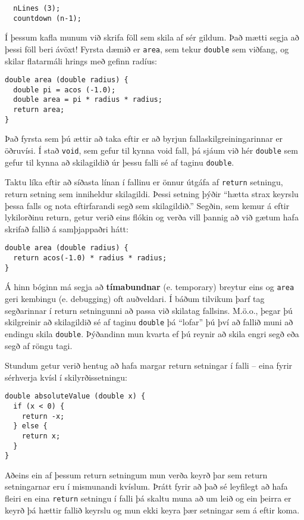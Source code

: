 \begin{verbatim}
  nLines (3);
  countdown (n-1);
\end{verbatim}
%
Í þessum kafla munum við skrifa föll sem skila af sér gildum.
Það mætti segja að þessi föll beri ávöxt!
Fyrsta dæmið er {\tt area}, sem tekur {\tt double} sem viðfang, og skilar flatarmáli hrings með gefinn radíus:


\begin{verbatim}
double area (double radius) {
  double pi = acos (-1.0);
  double area = pi * radius * radius;
  return area;
}
\end{verbatim}
%
Það fyrsta sem þú ættir að taka eftir er að byrjun fallaskilgreiningarinnar er öðruvísi.
Í stað {\tt void}, sem gefur til kynna void fall, þá sjáum við hér {\tt double} sem gefur til kynna að skilagildið úr þessu falli sé af taginu {\tt double}.

Taktu líka eftir að síðasta línan í fallinu er önnur útgáfa af {\tt return} setningu, return setning sem inniheldur skilagildi.
Þessi setning þýðir ``hætta strax keyrslu þessa falls og nota eftirfarandi segð sem skilagildið.''
Segðin, sem kemur á eftir lykilorðinu return, getur verið eins flókin og verða vill þannig að við gætum hafa skrifað fallið á samþjappaðri hátt:

\begin{verbatim}
double area (double radius) {
  return acos(-1.0) * radius * radius;
}
\end{verbatim}
%
Á hinn bóginn má segja að {\bf tímabundnar} (e. temporary) breytur eins og {\tt area} geri kembingu (e. debugging) oft auðveldari.
Í báðum tilvikum þarf tag segðarinnar í return setningunni að passa við skilatag fallsins.
M.ö.o., þegar þú skilgreinir að skilagildið sé af taginu {\tt double} þá ``lofar'' þú því að fallið muni að endingu skila {\tt double}.
Þýðandinn mun kvarta ef þú reynir að skila engri segð eða segð af röngu tagi. 


Stundum getur verið hentug að hafa margar return setningar í falli -- eina fyrir sérhverja kvísl í skilyrðissetningu:

\begin{verbatim}
double absoluteValue (double x) {
  if (x < 0) {
    return -x;
  } else {
    return x;
  }
}
\end{verbatim}
%
Aðeins ein af þessum return setningum mun verða keyrð þar sem return setningarnar eru í mismunandi kvíslum.
Þrátt fyrir að það sé leyfilegt að hafa fleiri en eina {\tt return} setningu í falli þá skaltu muna að um leið og ein þeirra er keyrð þá hættir fallið keyrslu og mun ekki keyra þær setningar sem á eftir koma.

